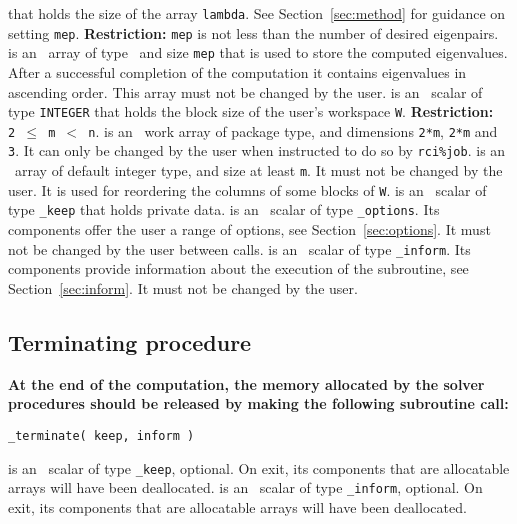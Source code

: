 \begin{description}
that holds the size of the array {\tt lambda}.
See Section~\ref{sec:method} for guidance on
setting {\tt mep}.
{\bf Restriction:} 
{\tt mep} is not less than the number of desired eigenpairs.
%
 is an \intentinout\
array of type \REALDP\
and size {\tt mep} that is
used to store the computed eigenvalues.
After a successful completion of the computation
it contains eigenvalues in ascending order.
This array must not be changed by the user.
%
 is an \intentin\ scalar of type {\tt INTEGER} that
holds the block size of the user's workspace {\tt W}. 
{\bf Restriction:} \\{\tt 2 $\le$ m $<$ n}.
%
 is an \intentinout\
work array of package type,
and dimensions {\tt 2*m}, {\tt 2*m} and {\tt 3}.
It can only be changed by the user when
instructed to do so by 
{\tt rci\%job}.
%
 is an \intentinout\ 
array of default integer type, and size at least {\tt m}. 
It must not be changed by the user.
It is used for reordering the columns of some blocks of {\tt W}.
%
\itt{keep} is an \intentinout\ scalar of type 
{\tt \solver\_keep} 
that holds private data. 
%
\itt{options} is an \intentin\  scalar  of type {\tt \solver\_options}.
Its components offer the user a range of options,
see Section~\ref{sec:options}.
It must not be changed by the user between calls.
%
\itt{inform} is an \intentinout\ scalar of type 
{\tt \solver\_inform}. Its components provide information about the execution
of the subroutine, see Section~\ref{sec:inform}.
It must not be changed by the user.
%
\end{description}

\subsection{Terminating procedure}

{\bf
At the end of the computation, the memory 
allocated by the solver procedures
should be released
by making the following subroutine call:
}

\medskip

\hspace{8mm} {\tt \solver\_terminate( keep, inform )}

\begin{description}
%
\itt{keep} is an \intentinout\ scalar of type 
{\tt \solver\_keep}, optional. 
On exit, its components that are allocatable arrays will have been deallocated. 
%
\itt{inform} is an \intentinout\ scalar of type {\tt \solver\_inform}, 
optional.
On exit, its components that are allocatable arrays will have been deallocated. 
%
\end{description}

